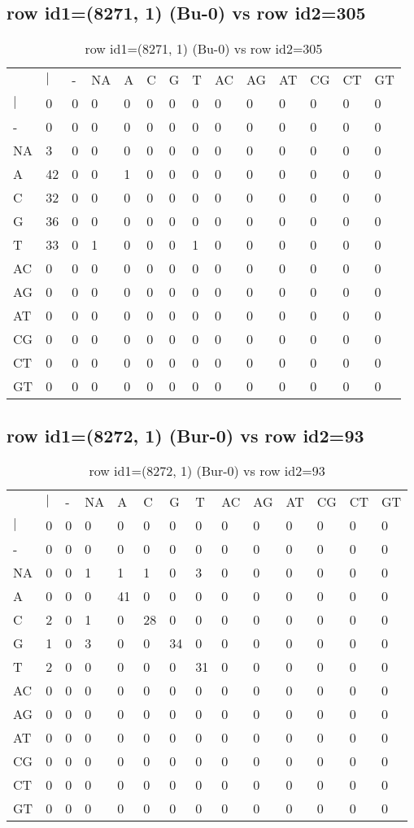 \subsection{row id1=(8271, 1) (Bu-0) vs row id2=305}
\begin{center}
\begin{longtable}{|l|l|l|l|l|l|l|l|l|l|l|l|l|l|}
\caption{row id1=(8271, 1) (Bu-0) vs row id2=305} \label{table_dm224}\\
\hline
\\
\hline
&$|$&-&NA&A&C&G&T&AC&AG&AT&CG&CT&GT\\
$|$&0&0&0&0&0&0&0&0&0&0&0&0&0\\
-&0&0&0&0&0&0&0&0&0&0&0&0&0\\
NA&3&0&0&0&0&0&0&0&0&0&0&0&0\\
A&42&0&0&1&0&0&0&0&0&0&0&0&0\\
C&32&0&0&0&0&0&0&0&0&0&0&0&0\\
G&36&0&0&0&0&0&0&0&0&0&0&0&0\\
T&33&0&1&0&0&0&1&0&0&0&0&0&0\\
AC&0&0&0&0&0&0&0&0&0&0&0&0&0\\
AG&0&0&0&0&0&0&0&0&0&0&0&0&0\\
AT&0&0&0&0&0&0&0&0&0&0&0&0&0\\
CG&0&0&0&0&0&0&0&0&0&0&0&0&0\\
CT&0&0&0&0&0&0&0&0&0&0&0&0&0\\
GT&0&0&0&0&0&0&0&0&0&0&0&0&0\\
\hline
\end{longtable}
\end{center}

\subsection{row id1=(8272, 1) (Bur-0) vs row id2=93}
\begin{center}
\begin{longtable}{|l|l|l|l|l|l|l|l|l|l|l|l|l|l|}
\caption{row id1=(8272, 1) (Bur-0) vs row id2=93} \label{table_dm226}\\
\hline
\\
\hline
&$|$&-&NA&A&C&G&T&AC&AG&AT&CG&CT&GT\\
$|$&0&0&0&0&0&0&0&0&0&0&0&0&0\\
-&0&0&0&0&0&0&0&0&0&0&0&0&0\\
NA&0&0&1&1&1&0&3&0&0&0&0&0&0\\
A&0&0&0&41&0&0&0&0&0&0&0&0&0\\
C&2&0&1&0&28&0&0&0&0&0&0&0&0\\
G&1&0&3&0&0&34&0&0&0&0&0&0&0\\
T&2&0&0&0&0&0&31&0&0&0&0&0&0\\
AC&0&0&0&0&0&0&0&0&0&0&0&0&0\\
AG&0&0&0&0&0&0&0&0&0&0&0&0&0\\
AT&0&0&0&0&0&0&0&0&0&0&0&0&0\\
CG&0&0&0&0&0&0&0&0&0&0&0&0&0\\
CT&0&0&0&0&0&0&0&0&0&0&0&0&0\\
GT&0&0&0&0&0&0&0&0&0&0&0&0&0\\
\hline
\end{longtable}
\end{center}


